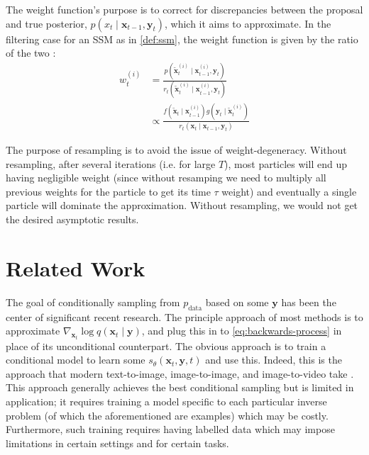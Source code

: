\begin{remark}
    The weight function's purpose is to correct for discrepancies between the proposal and true
    posterior, $p(x_t \mid \mathbf{x}_{t-1}, \mathbf{y}_t)$, which it aims to approximate. In the
    filtering case for an SSM as in \ref{def:ssm}, the weight function is given by the ratio of the
    two \parencite{chopinIntroductionSequentialMonte2020}:
    \begin{align*}
        w_t^{(i)} &= \frac{p(\tilde{\mathbf{x}}_t^{(i)} \mid \mathbf{x}_{t-1}^{(i)}, \mathbf{y}_t)}{r_t(\tilde{\mathbf{x}}_t^{(i)} \mid \mathbf{x}_{t-1}^{(i)}, \mathbf{y}_{t})} \\
        &\propto \frac{f(\tilde{\mathbf{x}}_t \mid \mathbf{x}_{t-1}^{(i)})g(\mathbf{y}_t \mid \tilde{\mathbf{x}}_t^{(i)})}{r_t(\mathbf{x}_t \mid \mathbf{x}_{t-1}, \mathbf{y}_{t})}
    \end{align*}
\end{remark}

\begin{remark}[Resampling]
    The purpose of resampling is to avoid the issue of weight-degeneracy. Without resampling,
    after several iterations (i.e. for large $T$), most particles will end up having negligible
    weight (since without resamping we need to multiply all previous weights for the particle to
    get its time $\tau$ weight) and eventually a single particle will dominate the approximation.
    Without resampling, we would not get the desired asymptotic results.
\end{remark}

\section{Related Work} \label{sec:related-work}

The goal of conditionally sampling from $p_{\text{data}}$ based on some $\mathbf{y}$ has been the
center of significant recent research. The principle approach of most methods is to
approximate $\nabla_{\mathbf{x}_t}\log q(\mathbf{x}_t \mid \mathbf{y})$, and plug this in to
\ref{eq:backwards-process} in place of its unconditional counterpart. The obvious approach is to
train a conditional model to learn some $s_{\theta}(\mathbf{x}_t, \mathbf{y}, t)$ and use this.
Indeed, this is the approach that modern text-to-image, image-to-image, and image-to-video take
\parencite{nicholGLIDEPhotorealisticImage2021,liDiffusionModelsImage2023,
sahariaPaletteImagetoImageDiffusion2021,sahariaPaletteImagetoImageDiffusion2021,
rombachHighResolutionImageSynthesis2021}. This approach generally achieves the best conditional
sampling but is limited in application; it requires training a model specific to each particular
inverse problem (of which the aforementioned are examples) which may be costly. Furthermore, such
training requires having labelled data which may impose limitations in certain settings and for
certain tasks.

